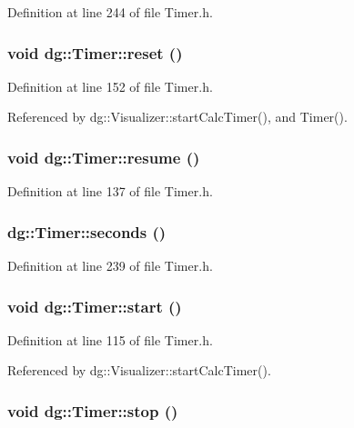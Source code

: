 Definition at line 244 of file Timer.h.
\subsubsection{\setlength{\rightskip}{0pt plus 5cm}void dg::Timer::reset ()\hspace{0.3cm}{\tt  [inline]}}\label{classdg_1_1Timer_a6}




Definition at line 152 of file Timer.h.

Referenced by dg::Visualizer::start\-Calc\-Timer(), and Timer().
\subsubsection{\setlength{\rightskip}{0pt plus 5cm}void dg::Timer::resume ()\hspace{0.3cm}{\tt  [inline]}}\label{classdg_1_1Timer_a5}




Definition at line 137 of file Timer.h.
\subsubsection{ dg::Timer::seconds ()\hspace{0.3cm}{\tt  [inline]}}\label{classdg_1_1Timer_a14}




Definition at line 239 of file Timer.h.
\subsubsection{\setlength{\rightskip}{0pt plus 5cm}void dg::Timer::start ()\hspace{0.3cm}{\tt  [inline]}}\label{classdg_1_1Timer_a2}




Definition at line 115 of file Timer.h.

Referenced by dg::Visualizer::start\-Calc\-Timer().
\subsubsection{\setlength{\rightskip}{0pt plus 5cm}void dg::Timer::stop ()\hspace{0.3cm}{\tt  [inline]}}\label{classdg_1_1Timer_a3}




